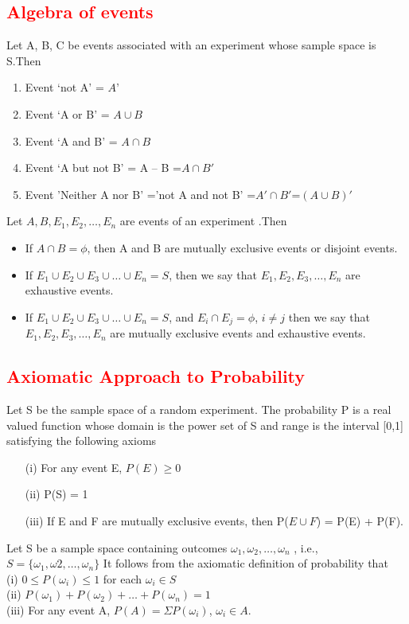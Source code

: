 \documentclass{article}
\begin{document}
\begin{multicols}{2}
\subsection*{\large \textcolor{red}{Algebra of events}}
Let A, B, C be events associated with an experiment whose sample space is S.Then 
\begin{enumerate}
    \item     Event ‘not A’ = $A’$
    \item Event ‘A or B’ = $A \cup B$
    \item Event ‘A and B’ = $A \cap B$
    \item Event ‘A but not B’ = A – B =$A \cap B'$
    \item Event 'Neither A nor B' ='not A and not B' =$A' \cap B'$=$(A \cup B)'$
\end{enumerate}

Let $A,B,E_1,E_2,\dots , E_n$ are events of an experiment .Then
\begin{itemize}
    \item If $A \cap B = \phi$, then A and B are mutually exclusive events or disjoint events.
    \item If $E_1 \cup E_2 \cup E_3 \cup \dots \cup E_n = S$, then we say that $E_1, E_2, E_3, \dots, E_n$ are exhaustive events.
    \item If $E_1 \cup E_2 \cup E_3 \cup \dots \cup E_n = S$, and $E_i \cap E_j = \phi$, $i \not = j$ then we say that $E_1, E_2, E_3, \dots, E_n$ are mutually exclusive events and exhaustive events.

    
\end{itemize}

\subsection*{\large \textcolor{red}{Axiomatic Approach to Probability}}
Let S be the sample space of a random experiment. The probability P is a real
valued function whose domain is the power set of S and range is the interval [0,1]
satisfying the following axioms
\begin{enumerate}
    \item[(i)] For any event E, $P (E) \geq 0$
    \item[(ii)]P(S) = 1
    \item[(iii)] If E and F are mutually exclusive events, then P($E \cup F$) = P(E) + P(F). 
\end{enumerate} 

Let S be a sample space containing outcomes $\omega_1 , \omega_2 ,\dots, \omega_n$ , i.e.,
$S = \{\omega_1, \omega2, \dots, \omega_n\}$
It follows from the axiomatic definition of probability that\\
(i) $0 \leq P (\omega_i) \leq 1$ for each $\omega_i \in S$\\
(ii) $P (\omega_1) + P (\omega_2) + \dots + P (\omega_n) = 1$\\
(iii) For any event A, $P(A) = \Sigma P(\omega_i )$, $\omega_i \in A$.



\end{multicols}
\end{document}
